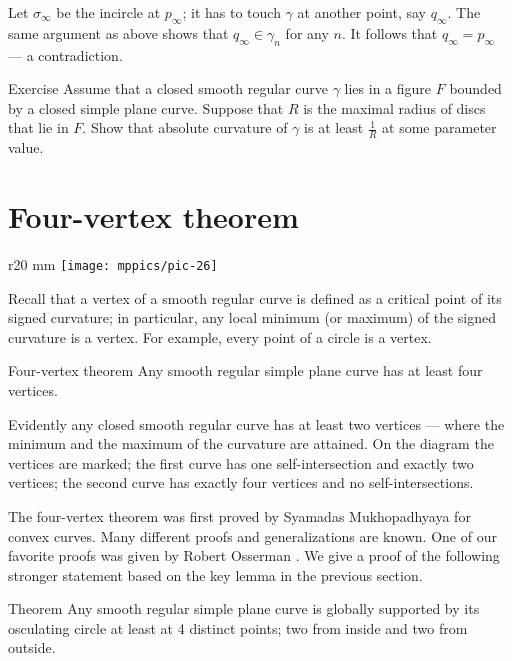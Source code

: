 Let $\sigma_\infty$ be the incircle at $p_\infty$; it has to touch $\gamma$ at another point, say $q_\infty$.
The same argument as above shows that $q_\infty\in\gamma_n$ for any $n$.
It follows that $q_\infty =p_\infty$ --- a contradiction.
\qeds

\begin{thm}{Exercise}\label{ex:moon-rad}
Assume that a closed smooth regular curve $\gamma$ lies in a figure $F$ bounded by a closed simple plane curve.
Suppose that $R$ is the maximal radius of discs that lie in $F$.
Show that absolute curvature of $\gamma$ is at least $\tfrac1R$ at some parameter value.
\end{thm}


\section{Four-vertex theorem}
{

\begin{wrapfigure}{r}{20 mm}
\vskip-8mm
\centering
\texttt{[image: mppics/pic-26]}
\vskip0mm
\end{wrapfigure}

Recall that a vertex of a smooth regular curve is defined as a critical point of its signed curvature;
in particular, any local minimum (or maximum) of the signed curvature is a vertex.
For example, every point of a circle is a vertex.

\begin{thm}{Four-vertex theorem}\label{thm:4-vert}
Any smooth regular simple plane curve has at least four
vertices.
\end{thm}

}

Evidently any closed smooth regular curve has at least two vertices --- where the minimum and the maximum of the curvature are attained.
On the diagram the vertices are marked;
the first curve has one self-intersection and exactly two vertices;
the second curve has exactly four vertices and no self-intersections.

The four-vertex theorem was first proved by Syamadas Mukhopadhyaya \cite{mukhopadhyaya} for convex curves.
Many different proofs and generalizations are known.
One of our favorite proofs was given by Robert Osserman \cite{osserman}.
We give a proof  of the following stronger statement  based on the key lemma in the previous section.


\begin{thm}{Theorem}\label{thm:4-vert-supporting}
Any smooth regular simple plane curve is globally supported by its osculating circle at least at 4 distinct points;
two from inside and two from outside.
\end{thm}

